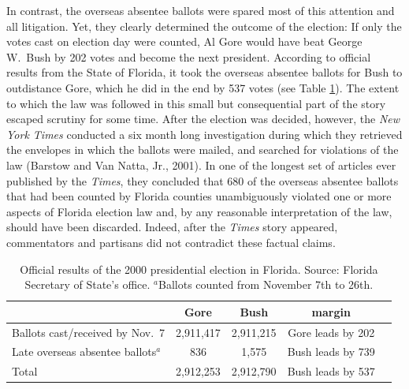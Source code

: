 \documentclass[11pt,titlepage]{article}
\begin{document}
In contrast, the overseas absentee ballots were spared most of this
attention and all litigation.  Yet, they clearly determined the
outcome of the election: If only the votes cast on election day were
counted, Al Gore would have beat George W.\ Bush by 202 votes and
become the next president.  According to official results from the
State of Florida, it took the overseas absentee ballots for Bush to
outdistance Gore, which he did in the end by 537 votes (see Table
\ref{tb:official}).  The extent to which the law was followed in this
small but consequential part of the story escaped scrutiny for some
time. After the election was decided, however, the \emph{New York
  Times} conducted a six month long investigation during which they
retrieved the envelopes in which the ballots were mailed, and searched
for violations of the law (Barstow and Van Natta, Jr., 2001).  In one
of the longest set of articles ever published by the \emph{Times},
they concluded that 680 of the overseas absentee ballots that had been
counted by Florida counties unambiguously violated one or more aspects
of Florida election law and, by any reasonable interpretation of the
law, should have been discarded.  Indeed, after the \emph{Times} story
appeared, commentators and partisans did not contradict these factual
claims.
\begin{table}[t]
\begin{center}
\begin{tabular}{lcccc}
                               & Gore      & Bush      & margin \\ \hline 
Ballots cast/received by Nov.\ 7&2,911,417 & 2,911,215 & Gore leads by 202 \\
Late overseas absentee ballots$^a$ &   836 &     1,575 & Bush leads by 739 \\
\hline
Total                          & 2,912,253 & 2,912,790 & Bush leads by 537 \\
\end{tabular} \caption{Official results of the 2000 presidential
  election in Florida.  Source: Florida Secretary of State's office.
  $^a$Ballots counted from November 7th to 26th.}
\label{tb:official}
\end{center}
\end{table} 
\end{document}

